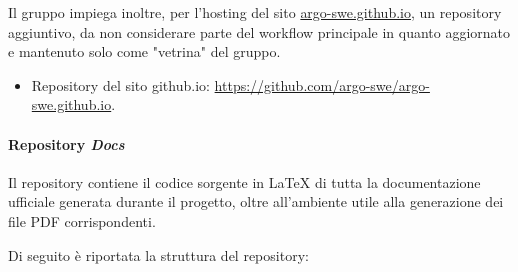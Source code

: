 \vspace{0.5\baselineskip}
\par Il gruppo impiega inoltre, per l'hosting del sito \href{https://argo-swe.github.io}{argo-swe.github.io}, un repository aggiuntivo, da non considerare parte del workflow principale in quanto aggiornato e mantenuto solo come "vetrina" del gruppo.
\begin{itemize}
  \item Repository del sito github.io: \href{https://github.com/argo-swe/argo-swe.github.io}{https://github.com/argo-swe/argo-swe.github.io}.
\end{itemize}

\paragraph{Repository \emph{Docs}}
Il repository contiene il codice sorgente in LaTeX di tutta la documentazione ufficiale generata durante il progetto, oltre all'ambiente utile alla generazione dei file PDF corrispondenti.\\
\par Di seguito è riportata la struttura del repository:
